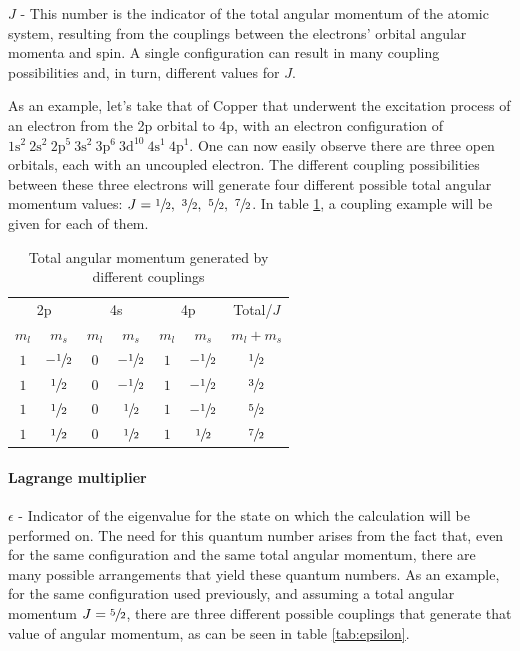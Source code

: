$J$ - This number is the indicator of the total angular momentum of the atomic system, resulting from the couplings between the electrons'  orbital angular momenta and spin. A single configuration can result in many coupling possibilities and, in turn, different values for $J$.

As an example, let's take that of Copper that underwent the excitation process of an electron from the 2p orbital to 4p, with an electron configuration of $1\text{s}^2\ 2\text{s}^2\ 2\text{p}^5\ 3\text{s}^2\ 3\text{p}^6\ 3\text{d}^{10}\ 4\text{s}^1\  4\text{p}^1 $. One can now easily observe there are three open orbitals, each with an uncoupled electron. The different coupling possibilities between these three electrons will generate four different possible total angular momentum values: $J=\sfrac{1}{2},\ \sfrac{3}{2},\ \sfrac{5}{2},\ \sfrac{7}{2}$. In table \ref{tab:tot_ang_mom}, a coupling example will be given for each of them.


\begin{table}[h!]
    \centering
    \caption{Total angular momentum generated by different couplings}
    \label{tab:tot_ang_mom}
    \begin{tabular}{cc|cc|cc|c}
        \toprule \multicolumn{2}{c|}{2p}&\multicolumn{2}{c|}{4s}&\multicolumn{2}{c|}{4p}&Total/$J$\\
        $m_l$ & $m_s$ & $m_l$&$m_s$&$m_l$&$m_s$&$m_l+m_s$\\\midrule
        $1$&$-\sfrac{1}{2}$&$0$&$-\sfrac{1}{2}$&$1$&$-\sfrac{1}{2}$&$\sfrac{1}{2}$\\
        $1$&$\sfrac{1}{2}$&$0$&$-\sfrac{1}{2}$&$1$&$-\sfrac{1}{2}$&$\sfrac{3}{2}$\\
        $1$&$\sfrac{1}{2}$&$0$&$\sfrac{1}{2}$&$1$&$-\sfrac{1}{2}$&$\sfrac{5}{2}$\\
        $1$&$\sfrac{1}{2}$&$0$&$\sfrac{1}{2}$&$1$&$\sfrac{1}{2}$&$\sfrac{7}{2}$\\\bottomrule
    \end{tabular}
\end{table}

\paragraph{Lagrange multiplier} $\epsilon$ - Indicator of the eigenvalue for the state on which the calculation will be performed on. The need for this quantum number arises from the fact that, even for the same configuration and the same total angular momentum, there are many possible arrangements that yield these quantum numbers. As an example, for the same configuration used previously, and assuming a total angular momentum $J=\sfrac{5}{2}$, there are three different possible couplings that generate that value of angular momentum, as can be seen in table \ref{tab:epsilon}.


